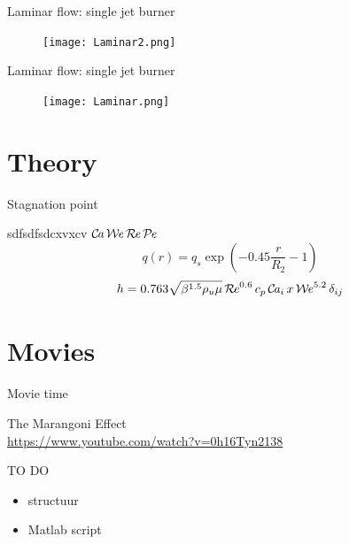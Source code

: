 \documentclass[11pt,aspectratio=43,mathserif]{beamer}
\begin{document}
\begin{frame}{Laminar flow: single jet burner}
\begin{figure}[H] 
		\texttt{[image: Laminar2.png]} 
	\end{figure}
\end{frame}

\begin{frame}{Laminar flow: single jet burner}
	\begin{figure}[H]
		\centering 
		\texttt{[image: Laminar.png]}
	\end{figure}
\end{frame}



\section{Theory}
\begin{frame}{Stagnation point}
\newcommand{\Rey}{\operatorname{\mathit{\mathcal{R}\kern-.14em e}}}

\newcommand{\Web}{\operatorname{\mathit{\mathcal{W}\kern-.14em e}}}

\newcommand{\Pec}{\operatorname{\mathit{\mathcal{P}\kern-.14em e}}}

\newcommand{\Capi}{\operatorname{\mathit{\mathcal{C}\kern-.14em a}}}
sdfsdfsdcxvxcv
$
	\Capi
	\Web
	\Rey
	\Pec
	$
	\[
		q(r) = q_s \exp \left(-0.45\frac{r}{R_2} - 1 \right)
	\]
	\[		h = 0.763 \sqrt{\beta^{1.5} \rho_u \mu} \Rey^{0.6} c_p \Capi_i x \Web^{5.2} \delta_{ij}
	\]
 \end{frame}
\section{Movies}
\begin{frame}{Movie time}
\begin{center}%
\newline
The Marangoni Effect
\\
{\scriptsize \url{https://www.youtube.com/watch?v=0h16Tyn2138}}
\end{center}%
\end{frame}

\begin{frame}[standout]{TO DO}
	\begin{itemize}
		\item structuur \\
		\item Matlab script\\
	\end{itemize}
\end{frame}
\end{document}
